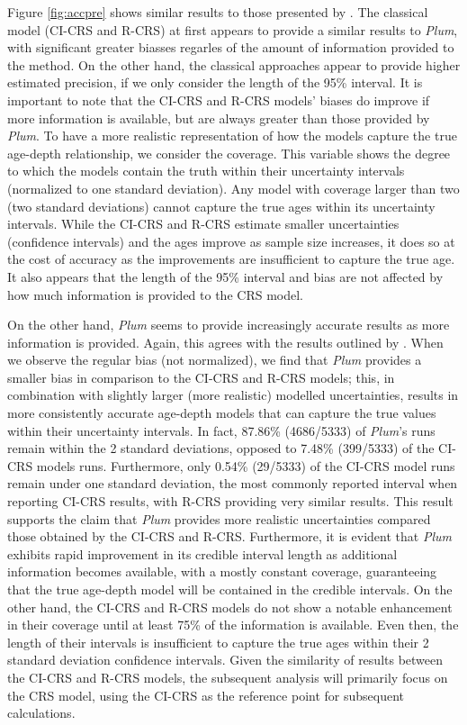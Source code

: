 \documentclass [10pt] {article}
\begin{document}
Figure \ref{fig:accpre} shows similar results to those presented by \citet{Blaauw2018}. 
The classical model (CI-CRS and R-CRS) at first appears to provide a similar results to \textit{Plum}, with significant greater biasses regarles of the amount of information provided to the method. On the other hand, the classical approaches appear to provide higher estimated precision, if we only consider the length of the 95\% interval. 
It is important to note that the CI-CRS and R-CRS models' biases do improve if more information is available, but are always greater than those provided by \textit{Plum}. 
To have a more realistic representation of how the models capture the true age-depth relationship, we consider the coverage. 
This variable shows the degree to which the models contain the truth within their uncertainty intervals (normalized to one standard deviation). Any model with coverage larger than two (two standard deviations) cannot capture the true ages within its uncertainty intervals. While the CI-CRS and R-CRS estimate smaller uncertainties (confidence intervals) and the ages improve as sample size increases, it does so at the cost of accuracy as the improvements are insufficient to capture the true age. It also appears that the length of the 95\% interval and bias are not affected by how much information is provided to the CRS model.

On the other hand, \textit{Plum} seems to provide increasingly accurate results as more information is provided.
Again, this agrees with the results outlined by \citet{Blaauw2018}. 
When we observe the regular bias (not normalized), we find that \textit{Plum} provides a smaller bias in comparison to the CI-CRS and R-CRS models; this, in combination with slightly larger (more realistic) modelled uncertainties, results in more consistently accurate age-depth models that can capture the true values within their uncertainty intervals. 
In fact, 87.86\% (4686/5333) of \textit{Plum}'s runs remain within the 2 standard deviations, opposed to 7.48\% (399/5333) of the CI-CRS models runs. 
Furthermore, only 0.54\% (29/5333) of the CI-CRS model runs remain under one standard deviation, the most commonly reported interval when reporting CI-CRS results, with R-CRS providing very similar results.
This result supports the claim that \textit{Plum} provides more realistic uncertainties compared those obtained by the CI-CRS and R-CRS. 
Furthermore, it is evident that \textit{Plum} exhibits rapid improvement in its credible interval length as additional information becomes available, with a mostly constant coverage, guaranteeing that the true age-depth model will be contained in the credible intervals. On the other hand, the CI-CRS and R-CRS models do not show a notable enhancement in their coverage until at least 75\% of the information is available. Even then, the length of their intervals is insufficient to capture the true ages within their 2 standard deviation confidence intervals. Given the similarity of results between the CI-CRS and R-CRS models, the subsequent analysis will primarily focus on the CRS model, using the CI-CRS as the reference point for subsequent calculations.
\end{document}
